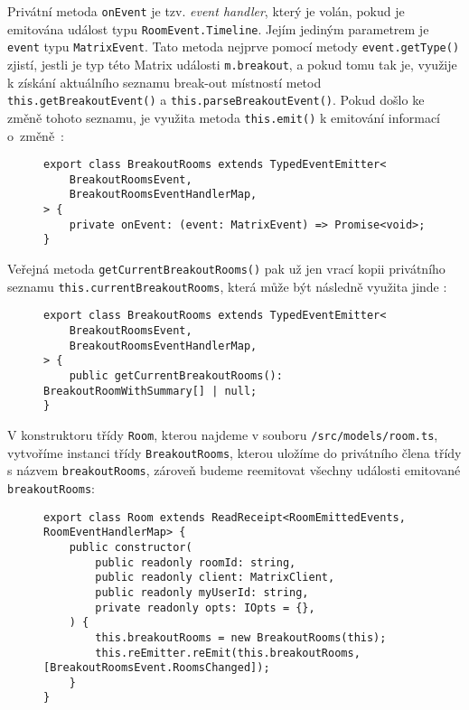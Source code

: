 Privátní metoda \texttt{onEvent} je tzv. \textit{event handler},
který je volán, pokud je emitována událost typu
\texttt{RoomEvent.Timeline}. Jejím jediným parametrem je
\texttt{event} typu \texttt{MatrixEvent}. Tato
metoda nejprve pomocí metody \texttt{event.getType()} zjistí,
jestli je typ této Matrix události \texttt{m.breakout}, a pokud tomu
tak je, využije k získání aktuálního seznamu break-out místností metod
\texttt{this.getBreakoutEvent()} a
\texttt{this.parseBreakoutEvent()}. Pokud došlo ke změně tohoto
seznamu, je využita metoda \texttt{this.emit()} k emitování
informací o~změně~\parencite{GitHub-MatrixJSSDK-BreakoutRooms}:

\begin{figure}[H]
    \begin{verbatim}
export class BreakoutRooms extends TypedEventEmitter<
	BreakoutRoomsEvent,
	BreakoutRoomsEventHandlerMap,
> {
	private onEvent: (event: MatrixEvent) => Promise<void>;
}
	\end{verbatim}
\end{figure}

Veřejná metoda \texttt{getCurrentBreakoutRooms()} pak už jen
vrací kopii privátního seznamu
\texttt{this.currentBreakoutRooms}, která může být následně
využita jinde \parencite{GitHub-MatrixJSSDK-BreakoutRooms}:

\begin{figure}[H]
    \begin{verbatim}
export class BreakoutRooms extends TypedEventEmitter<
	BreakoutRoomsEvent,
	BreakoutRoomsEventHandlerMap,
> {
	public getCurrentBreakoutRooms(): BreakoutRoomWithSummary[] | null;
}
	\end{verbatim}
\end{figure}

V konstruktoru třídy \texttt{Room}, kterou najdeme v souboru
\texttt{/src/models/room.ts}, vytvoříme instanci třídy
\texttt{BreakoutRooms}, kterou uložíme do privátního člena třídy
s názvem \texttt{breakoutRooms}, zároveň budeme reemitovat
všechny události emitované \texttt{breakoutRooms}:

\begin{figure}[H]
    \begin{verbatim}
export class Room extends ReadReceipt<RoomEmittedEvents, RoomEventHandlerMap> {
	public constructor(
		public readonly roomId: string,
		public readonly client: MatrixClient,
		public readonly myUserId: string,
		private readonly opts: IOpts = {},
	) {
		this.breakoutRooms = new BreakoutRooms(this);
		this.reEmitter.reEmit(this.breakoutRooms, [BreakoutRoomsEvent.RoomsChanged]);
	}
}
	\end{verbatim}
\end{figure}

